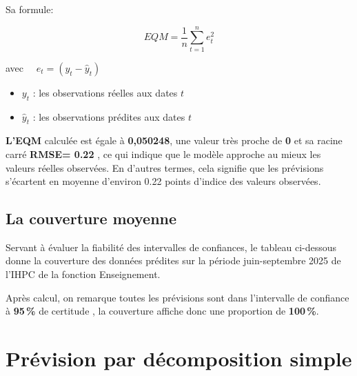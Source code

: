 \documentclass[
12pt,          %
a4paper,       %
oneside,       %
openright      %
]{report}
\begin{document}
 Sa formule: 
 
 \begin{equation}
 	EQM = \frac{1}{n} \sum_{t=1}^{n} e_t^2
 \end{equation}
 
 avec $\quad e_t = (y_t - \hat{y}_t)$
 
 \begin{itemize}
 	\item $y_t$ : les observations réelles aux dates $t$
 	\item $\hat{y}_t$ : les observations prédites aux dates $t$
 \end{itemize}
 
 \begin{table}[H]
 	\centering
 	
 	\caption{Erreur quadratique moyenne --- Lissage HOLT-WINTERS}
 	\label{tab:eqm_HOLT_WINTERS}
 \end{table}
 
 \textbf{L'EQM} calculée est égale à \textbf{0,050248}, une valeur très proche de \textbf{0} et sa racine carré \textbf{RMSE= 0.22} , ce qui indique que le modèle approche au mieux les valeurs réelles observées. En d'autres termes, cela signifie que les prévisions s’écartent en moyenne d’environ 0.22 points d’indice des valeurs observées.
 
 \section{La couverture moyenne}
 
 Servant à évaluer la fiabilité des intervalles de confiances, le tableau ci-dessous donne la couverture des données prédites sur la période juin-septembre 2025 de l'IHPC de la  fonction Enseignement. 
 
 
  \begin{table}[H]
 	\centering
 	
 	\caption{Couverture de l'intervalle de confiance --- Lissage HOLT-WINTERS}
 	\label{tab:couverture_ic_HOLT_WINTERS}
 \end{table}
 
 Après calcul, on remarque toutes les prévisions sont dans l'intervalle de confiance à \textbf{95\,\%} de certitude , la couverture affiche donc  une proportion de \textbf{100\,\%}.
 
 
 \chapter{Prévision par décomposition simple}
 
\end{document}
